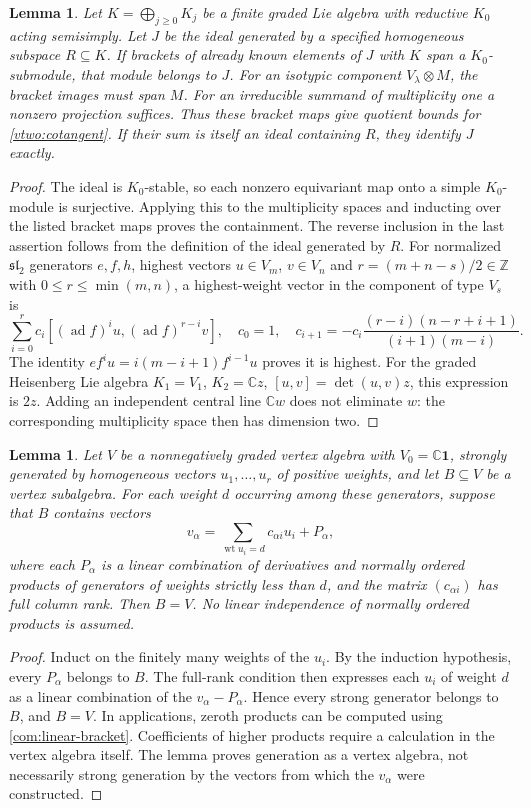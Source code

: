 \documentclass[11pt,a4paper]{amsart}
\numberwithin{equation}{section}
\newtheorem{lemma}[theorem]{Lemma}
\theoremstyle{definition}
\theoremstyle{remark}
\newcommand{\C}{\mathbb C}
\newcommand{\Z}{\mathbb Z}
\newcommand{\slg}{\mathfrak{sl}}
\newcommand{\ad}{\operatorname{ad}}
\newcommand{\wt}{\operatorname{wt}}
\begin{document}
\begin{lemma}
\label{v5:equivariant-generation}
Let $K=\bigoplus_{j\ge0}K_j$ be a finite graded Lie algebra with
reductive $K_0$ acting semisimply. Let $J$ be the ideal generated by
a specified homogeneous subspace $R\subseteq K$. If brackets of already known elements
of $J$ with $K$ span a $K_0$-submodule, that module belongs to $J$.
For an isotypic component $V_\lambda\otimes M$, the bracket images must span
$M$. For an irreducible summand of multiplicity one a nonzero projection suffices.
Thus these bracket maps give quotient bounds for
\cref{vtwo:cotangent}. If their sum is itself an ideal containing $R$,
they identify $J$ exactly.
\end{lemma}
\begin{proof}
The ideal is $K_0$-stable, so each nonzero equivariant map onto a
simple $K_0$-module is surjective. Applying this to the multiplicity spaces
and inducting over the listed bracket maps proves the containment. The
reverse inclusion in the last assertion follows from the definition of the
ideal generated by $R$.
For normalized $\slg_2$ generators $e,f,h$, highest vectors
$u\in V_m$, $v\in V_n$ and $r=(m+n-s)/2\in\Z$ with
$0\le r\le\min(m,n)$, a highest-weight vector in the component of type $V_s$ is
$$
 \sum_{i=0}^r c_i[(\ad f)^iu,(\ad f)^{r-i}v],\quad
 c_0=1,\quad
 c_{i+1}=-c_i\frac{(r-i)(n-r+i+1)}{(i+1)(m-i)}.
$$
The identity $ef^iu=i(m-i+1)f^{i-1}u$ proves it is highest.
For the graded Heisenberg Lie algebra $K_1=V_1$, $K_2=\C z$,
$[u,v]=\det(u,v)z$, this expression is $2z$. Adding an independent
central line $\C w$ does not eliminate $w$: the corresponding multiplicity
space then has dimension two.
\end{proof}

\begin{lemma}
\label{v5:triangular-generation}
Let $V$ be a nonnegatively graded vertex algebra with $V_0=\C\mathbf1$,
strongly generated by homogeneous vectors $u_1,\ldots,u_r$ of positive
weights, and let $B\subseteq V$ be a vertex subalgebra. For each
weight $d$ occurring among these generators, suppose that $B$ contains
vectors
$$
 v_\alpha=\sum_{\wt u_i=d}c_{\alpha i}u_i+P_\alpha,
$$
where each $P_\alpha$ is a linear combination of derivatives and
normally ordered products of generators of weights strictly less than
$d$, and the matrix $(c_{\alpha i})$ has full column rank. Then $B=V$.
No linear independence of normally ordered products is assumed.
\end{lemma}
\begin{proof}
Induct on the finitely many weights of the $u_i$. By the induction
hypothesis, every $P_\alpha$ belongs to $B$. The full-rank condition
then expresses each $u_i$ of weight $d$ as a linear combination of the
$v_\alpha-P_\alpha$. Hence every strong generator belongs to $B$,
and $B=V$.
In applications, zeroth products can be computed using
\cref{com:linear-bracket}. Coefficients of higher products require a
calculation in the vertex algebra itself. The lemma proves generation
as a vertex algebra, not necessarily strong generation by the vectors
from which the $v_\alpha$ were constructed.
\end{proof}
\end{document}
